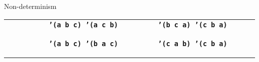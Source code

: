 \begin{frame}{Non-determinism}
  \tiny
  \begin{tabularx}{\textwidth}{ X X }
    \texttt{\ \newline
      \ \newline
      \ \newline
      \ \newline
      \ \newline
      \hphantom{\_\_\_\_\_\_}\textbf{'(a b c)\newline
      \hphantom{\_\_\_\_\_\_}'(a c b)}\newline
      \ 
    }
    &
    \texttt{\ \newline
      \ \newline
      \ \newline
      \hphantom{\_\_\_\_\_\_}\textbf{'(b c a)\newline
      \hphantom{\_\_\_\_\_\_}'(c b a)}\newline
      \ \newline
      \ \newline
      \ 
    }

    \\

    \texttt{\ \newline
      \ \newline
      \ \newline
      \ \newline
      \ \newline
      \hphantom{\_\_\_\_\_\_}\textbf{'(a b c)\newline
      \hphantom{\_\_\_\_\_\_}'(b a c)}\newline
      \ 
    }
    &
    \texttt{\ \newline
      \ \newline
      \ \newline
      \hphantom{\_\_\_\_\_\_}\textbf{'(c a b)\newline
      \hphantom{\_\_\_\_\_\_}'(c b a)}\newline
      \ \newline
      \ \newline
      \ 
    }

  \end{tabularx}
\end{frame}

